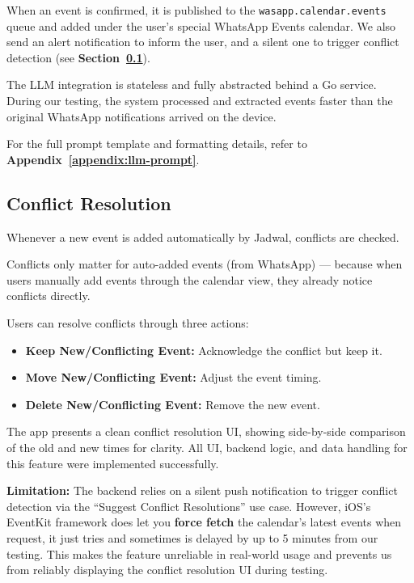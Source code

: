 When an event is confirmed, it is published to the \texttt{wasapp.calendar.events} queue and added under the user’s special WhatsApp Events calendar. We also send an alert notification to inform the user, and a silent one to trigger conflict detection (see \textbf{Section~\ref{subsec:conflict-resolution}}).

The LLM integration is stateless and fully abstracted behind a Go service. During our testing, the system processed and extracted events faster than the original WhatsApp notifications arrived on the device.

For the full prompt template and formatting details, refer to \textbf{Appendix~\ref{appendix:llm-prompt}}.

\subsection{Conflict Resolution} \label{subsec:conflict-resolution}

Whenever a new event is added automatically by Jadwal, conflicts are checked.

Conflicts only matter for auto-added events (from WhatsApp) — because when users manually add events through the calendar view, they already notice conflicts directly.

Users can resolve conflicts through three actions:
\begin{itemize}
    \item \textbf{Keep New/Conflicting Event:} Acknowledge the conflict but keep it.
    \item \textbf{Move New/Conflicting Event:} Adjust the event timing.
    \item \textbf{Delete New/Conflicting Event:} Remove the new event.
\end{itemize}

The app presents a clean conflict resolution UI, showing side-by-side comparison of the old and new times for clarity. All UI, backend logic, and data handling for this feature were implemented successfully.

\textbf{Limitation:} The backend relies on a silent push notification to trigger conflict detection via the “Suggest Conflict Resolutions” use case. However, iOS's EventKit framework does let you \textbf{force fetch} the calendar's latest events when request, it just tries and sometimes is delayed by up to 5 minutes from our testing. This makes the feature unreliable in real-world usage and prevents us from reliably displaying the conflict resolution UI during testing.

